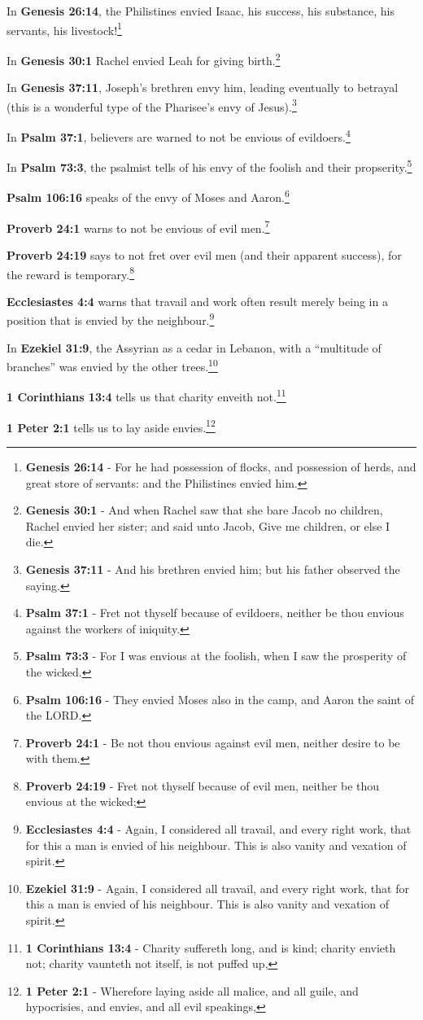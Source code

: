 \begin{compactenum}
	\item In \textbf{Genesis 26:14}, the Philistines envied Isaac, his success, his substance, his servants, his livestock!\footnote{\textbf{Genesis 26:14} - 
For he had possession of flocks, and possession of herds, and great store of servants: and the Philistines envied him.}
	\item In \textbf{Genesis 30:1} Rachel envied Leah for giving birth.\footnote{\textbf{Genesis 30:1} - And when Rachel saw that she bare Jacob no children, Rachel envied her sister; and said unto Jacob, Give me children, or else I die.}
	\item In \textbf{Genesis 37:11}, Joseph's brethren envy him, leading eventually to betrayal (this is a wonderful type of the Pharisee's envy of Jesus).\footnote{\textbf{Genesis 37:11} - And his brethren envied him; but his father observed the saying.}
	\item In \textbf{Psalm 37:1}, believers are warned to not be envious of evildoers.\footnote{\textbf{Psalm 37:1} - Fret not thyself because of evildoers, neither be thou envious against the workers of iniquity.}
	\item In \textbf{Psalm 73:3}, the psalmist tells of his envy of the foolish and their propserity.\footnote{\textbf{Psalm 73:3} - For I was envious at the foolish, when I saw the prosperity of the wicked.}
	\item \textbf{Psalm 106:16} speaks of the envy of Moses and Aaron.\footnote{\textbf{Psalm 106:16} - They envied Moses also in the camp, and Aaron the saint of the LORD.}
	\item \textbf{Proverb 24:1} warns to not be envious of evil men.\footnote{\textbf{Proverb 24:1} - Be not thou envious against evil men, neither desire to be with them.}
	\item \textbf{Proverb 24:19} says to not fret over evil men (and their apparent success), for the reward is temporary.\footnote{\textbf{Proverb 24:19} - Fret not thyself because of evil men, neither be thou envious at the wicked;}
	\item \textbf{Ecclesiastes 4:4} warns that travail and work often result merely being in a position that is envied by the neighbour.\footnote{\textbf{Ecclesiastes 4:4} - Again, I considered all travail, and every right work, that for this a man is envied of his neighbour. This is also vanity and vexation of spirit.}
	\item In \textbf{Ezekiel 31:9}, the Assyrian as a cedar in Lebanon, with a ``multitude of branches'' was envied by the other trees.\footnote{\textbf{Ezekiel 31:9} - Again, I considered all travail, and every right work, that for this a man is envied of his neighbour. This is also vanity and vexation of spirit.}
	\item \textbf{1 Corinthians 13:4} tells us that charity enveith not.\footnote{\textbf{1 Corinthians 13:4} - Charity suffereth long, and is kind; charity envieth not; charity vaunteth not itself, is not puffed up,}
	\item \textbf{1 Peter 2:1} tells us to lay aside envies.\footnote{\textbf{1 Peter 2:1} - Wherefore laying aside all malice, and all guile, and hypocrisies, and envies, and all evil speakings,}
\end{compactenum}
